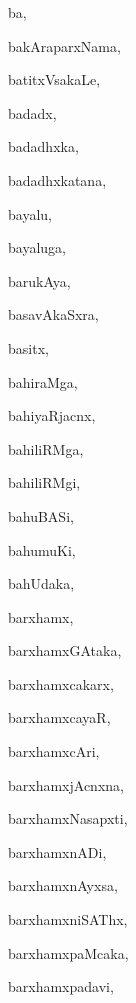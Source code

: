 \begin{multicols}{3}
{\noindent
{ba}, \pageref{ba}

\noindent
{bakAraparxNama}, \pageref{bakAraparxNama}

\noindent
{batitxVsakaLe}, \pageref{batitxVsakaLe}

\noindent
{badadx}, \pageref{badadx}

\noindent
{badadhxka}, \pageref{badadhxka}

\noindent
{badadhxkatana}, \pageref{badadhxkatana}

\noindent
{bayalu}, \pageref{bayalu}

\noindent
{bayaluga}, \pageref{bayaluga}

\noindent
{barukAya}, \pageref{barukAya}

\noindent
{basavAkaSxra}, \pageref{basavAkaSxra}

\noindent
{basitx}, \pageref{basitx}

\noindent
{bahiraMga}, \pageref{bahiraMga}

\noindent
{bahiyaRjacnx}, \pageref{bahiyaRjacnx}

\noindent
{bahiliRMga}, \pageref{bahiliRMga}

\noindent
{bahiliRMgi}, \pageref{bahiliRMgi}

\noindent
{bahuBASi}, \pageref{bahuBASi}

\noindent
{bahumuKi}, \pageref{bahumuKi}

\noindent
{bahUdaka}, \pageref{bahUdaka}

\noindent
{barxhamx}, \pageref{barxhamx}

\noindent
{barxhamxGAtaka}, \pageref{barxhamxGAtaka}

\noindent
{barxhamxcakarx}, \pageref{barxhamxcakarx}

\noindent
{barxhamxcayaR}, \pageref{barxhamxcayaR}

\noindent
{barxhamxcAri}, \pageref{barxhamxcAri}

\noindent
{barxhamxjAcnxna}, \pageref{barxhamxjAcnxna}

\noindent
{barxhamxNasapxti}, \pageref{barxhamxNasapxti}

\noindent
{barxhamxnADi}, \pageref{barxhamxnADi}

\noindent
{barxhamxnAyxsa}, \pageref{barxhamxnAyxsa}

\noindent
{barxhamxniSAThx}, \pageref{barxhamxniSAThx}

\noindent
{barxhamxpaMcaka}, \pageref{barxhamxpaMcaka}

\noindent
{barxhamxpadavi}, \pageref{barxhamxpadavi}

}
\end{multicols}
